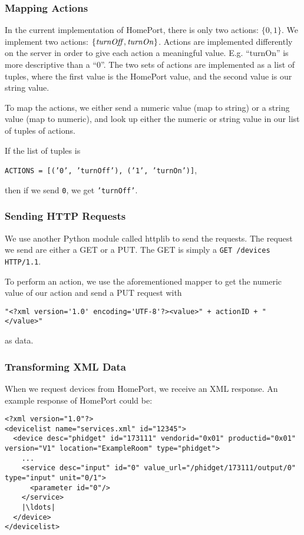 \subsubsection{Mapping Actions}
In the current implementation of HomePort, 
there is only two actions: $\{0, 1\}$.
We implement two actions: $\{\var{turnOff}, \var{turnOn}\}$. Actions are implemented differently on the server in order to give each action a meaningful value. E.g. ``turnOn'' is more descriptive than a ``0''.
The two sets of actions are implemented as a list of tuples, 
where the first value is the HomePort value, 
and the second value is our string value. 

To map the actions, we either send a numeric value (map to string) or a string value (map to numeric), 
and look up either the numeric or string value in our list of tuples of actions.

If the list of tuples is
\begin{center}
  \texttt{ACTIONS = [('0', 'turnOff'), ('1', 'turnOn')]},
\end{center}
then if we send \texttt{0}, we get \texttt{'turnOff'}. 

\subsubsection{Sending HTTP Requests}
We use another Python module called httplib to send the requests. 
The request we send are either a GET or a PUT. 
The GET is simply a \texttt{GET /devices HTTP/1.1}. 

To perform an action, we use the aforementioned mapper to get the numeric value of our action and send a PUT request with 
\begin{verbatim}
"<?xml version='1.0' encoding='UTF-8'?><value>" + actionID + "</value>"
\end{verbatim}
as data. 

\subsubsection{Transforming XML Data}
When we request devices from HomePort, 
we receive an XML response. 
An example response of HomePort could be:
\begin{verbatim}
<?xml version="1.0"?>
<devicelist name="services.xml" id="12345">
  <device desc="phidget" id="173111" vendorid="0x01" productid="0x01" version="V1" location="ExampleRoom" type="phidget">
    ...
    <service desc="input" id="0" value_url="/phidget/173111/output/0" type="input" unit="0/1">
      <parameter id="0"/>
    </service>
    |\ldots|
  </device>
</devicelist>
\end{verbatim}

